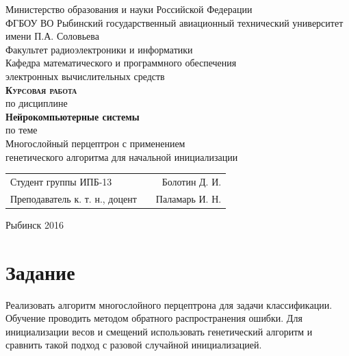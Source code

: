 \documentclass[a4paper,12pt]{article}
\begin{document}
\begin{titlepage}
\newpage


\begin{center}
	\large		
   	Министерство образования и науки Российской Федерации\\[0.5cm]
    	
	ФГБОУ ВО Рыбинский государственный авиационный технический университет имени П.А. Соловьева\\[1.0cm]

	Факультет радиоэлектроники и информатики\\[0.25cm]
		
	Кафедра математического и программного обеспечения\\ электронных вычислительных средств\\[1.5cm]
	
	\Large
	\textbf{\textsc{Курсовая работа}}\\[0.25cm]
	по  дисциплине\\
	\textbf{Нейрокомпьютерные системы}\\[0.5cm]
	
	по теме\\
	Многослойный перцептрон с применением \\генетического алгоритма для начальной инициализации
	
\end{center}

\vfill	
\begin{tabularx}{0.95\textwidth}{lXr}
Студент группы ИПБ-13 					& &	Болотин Д. И.\\

Преподаватель к. т. н., доцент			& & Паламарь И. Н.\\
\end{tabularx}

\vspace{1.5cm}
\center Рыбинск 2016
\end{titlepage}	


\newpage
\setcounter{page}{2}

\tableofcontents

\newpage\section*{Задание}

Реализовать алгоритм многослойного перцептрона для задачи классификации. Обучение проводить методом обратного распространения ошибки. Для инициализации весов и смещений использовать генетический алгоритм и сравнить такой подход с разовой случайной инициализацией.
\end{document}

